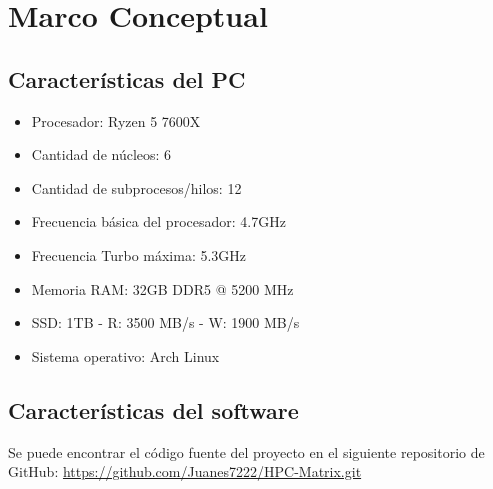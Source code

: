 
\section{Marco Conceptual}
\label{sec:Marco Conceptual}

\subsection{Características del PC}
\label{sec:Características del PC} 

\begin{itemize}
   \item Procesador: Ryzen 5 7600X
   \item Cantidad de núcleos: 6
   \item Cantidad de subprocesos/hilos: 12
   \item Frecuencia básica del procesador: 4.7GHz
   \item Frecuencia Turbo máxima: 5.3GHz
   \item Memoria RAM: 32GB DDR5 @ 5200 MHz
   \item SSD: 1TB - R: 3500 MB/s - W: 1900 MB/s
   \item Sistema operativo: Arch Linux
\end{itemize}

\subsection{Características del software}

Se puede encontrar el código fuente del proyecto en el siguiente repositorio de GitHub: \url{https://github.com/Juanes7222/HPC-Matrix.git}
